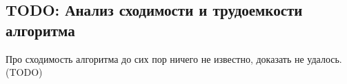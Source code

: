 \documentclass[a4paper,12pt, titlepage]{article}
\begin{document}

\subsection{TODO: Анализ сходимости и трудоемкости алгоритма}
Про сходимость алгоритма до сих пор ничего не известно, доказать не удалось.
(TODO)
\end{document}
